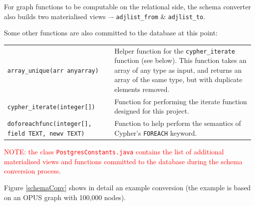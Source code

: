 \documentclass[letterpaper]{ltxdoc}
\begin{document}
For graph functions to be computable on the relational side, the schema converter also builds two materialised views –- \texttt{adjlist\_from} \& \texttt{adjlist\_to}.

Some other functions are also committed to the database at this point:

\begin{center}
\begin{tabular}{ p{4.5cm} p{9cm} }
\texttt{array\_unique(arr anyarray)} & Helper function for the \texttt{cypher\_iterate} function (see below). This function takes an array of any type as input, and returns an array of the same type, but with duplicate elements removed. \\

\texttt{cypher\_iterate(integer[])} & Function for performing the iterate function designed for this project. \\

\texttt{doforeachfunc(integer[], field TEXT, newv TEXT)} & Function to help perform the semantics of Cypher’s \texttt{FOREACH} keyword.
\end{tabular}
\end{center}

\medskip

\textcolor{red}{NOTE: the class \texttt{PostgresConstants.java} contains the list of additional materialised views and functions committed to the database during the schema conversion process.}

\medskip

Figure \ref{schemaConv} shows in detail an example conversion (the example is based on an OPUS graph with 100{,}000 nodes).
\end{document}
